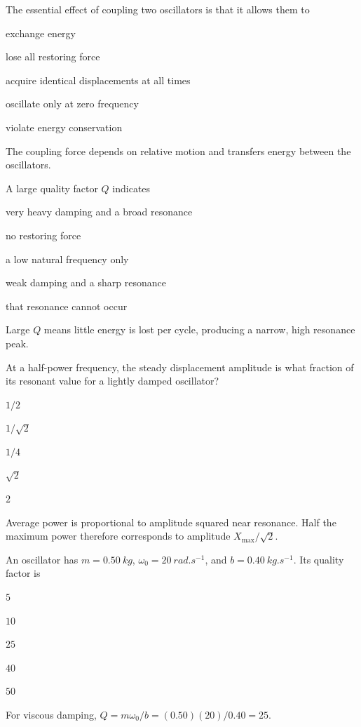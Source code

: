 \documentclass[10pt,a4paper,full]{physicsquiz}
\newcommand{\bankq}[9]{%
  \begin{quizquestion}[
    id=#1,
    topic={#2},
    difficulty=#3,
    marks=1,
    correct=#4,
    tags={#5},
    outcome={#6}
  ]
    #7
    \begin{choiceoptions}
      #8
    \end{choiceoptions}
  \end{quizquestion}
  \begin{quizsolution}
    #9
  \end{quizsolution}
}
\begin{document}
\begin{quizbank}

\bankq{coupled-026}{Coupled SHM, Q, and Power Response}{foundation}{A}{coupling,concept}{Recognize the effect of coupling.}{%
The essential effect of coupling two oscillators is that it allows them to}{%
\item exchange energy
\item lose all restoring force
\item acquire identical displacements at all times
\item oscillate only at zero frequency
\item violate energy conservation}{%
The coupling force depends on relative motion and transfers energy between the oscillators.}

\bankq{coupled-027}{Coupled SHM, Q, and Power Response}{foundation}{D}{quality-factor,definition}{Interpret the quality factor.}{%
A large quality factor \(Q\) indicates}{%
\item very heavy damping and a broad resonance
\item no restoring force
\item a low natural frequency only
\item weak damping and a sharp resonance
\item that resonance cannot occur}{%
Large \(Q\) means little energy is lost per cycle, producing a narrow, high resonance peak.}

\bankq{coupled-028}{Coupled SHM, Q, and Power Response}{foundation}{B}{power,response-curve}{Identify half-power points.}{%
At a half-power frequency, the steady displacement amplitude is what fraction of its resonant value for a lightly damped oscillator?}{%
\item \(1/2\)
\item \(1/\sqrt{2}\)
\item \(1/4\)
\item \(\sqrt{2}\)
\item \(2\)}{%
Average power is proportional to amplitude squared near resonance. Half the maximum power therefore corresponds to amplitude \(X_{\max}/\sqrt{2}\).}

\bankq{coupled-029}{Coupled SHM, Q, and Power Response}{applied}{C}{quality-factor,numerical}{Calculate quality factor from oscillator parameters.}{%
An oscillator has \(m=\SI{0.50}{kg}\), \(\omega_0=\SI{20}{rad.s^{-1}}\), and \(b=\SI{0.40}{kg.s^{-1}}\). Its quality factor is}{%
\item \(5\)
\item \(10\)
\item \(25\)
\item \(40\)
\item \(50\)}{%
For viscous damping, \(Q=m\omega_0/b=(0.50)(20)/0.40=25\).}


\end{quizbank}
\end{document}
